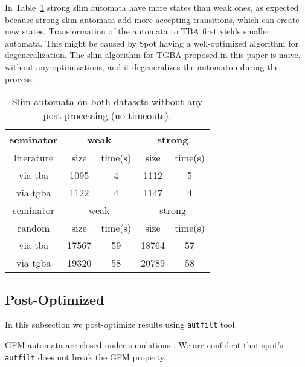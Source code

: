 \documentclass[
	digital,
nolof, nolot
]{fithesis3}
\begin{document}
	In Table~\ref{table:seminator:unoptimized} strong slim automata have more states than weak ones, as expected because strong slim automata add more accepting transitions, which can create new states. Transformation of the automata to TBA first yields smaller automata. This might be caused by Spot having a well-optimized algorithm for degeneralization. The slim algorithm for TGBA proposed in this paper is naive, without any optimizations, and it degeneralizes the automaton during the process.
\begin{table}[ht]
	\label{table:seminator:unoptimized}
	\centering
	\caption{Slim automata on both datasets without any post-processing (no timeouts).}
		\begin{tabular}{ |c||c|c|c|c| } 
			\hline
			seminator&\multicolumn{2}{c|}{weak}&\multicolumn{2}{c|}{strong} \\
			\hline
			literature&size&time(s)&size&time(s)\\
			\hhline{|=====|}
			
			via tba	&	1095	&4	& 1112 	&5\\
			\hline
			via tgba&	1122	&4		&1147	&4\\ 
			\hline
			\hline
			\hline
			seminator&\multicolumn{2}{c|}{weak}&\multicolumn{2}{c|}{strong} \\
			\hhline{|=====|}
			random&size&time(s)&size&time(s)\\
			\hline
			via tba&17567&	59& 18764 &57\\
			\hline
			via tgba&19320&	58& 20789&58\\ 
			\hline
		\end{tabular}
\end{table}
	\clearpage
	\subsection{Post-Optimized}
	In this subsection we post-optimize results using \texttt{autfilt} tool.
	
	GFM automata are closed under simulations \cite[Section~3.1]{hlavni}. We are confident that spot's \texttt{autfilt} does not break the GFM property.
	
\end{document}
